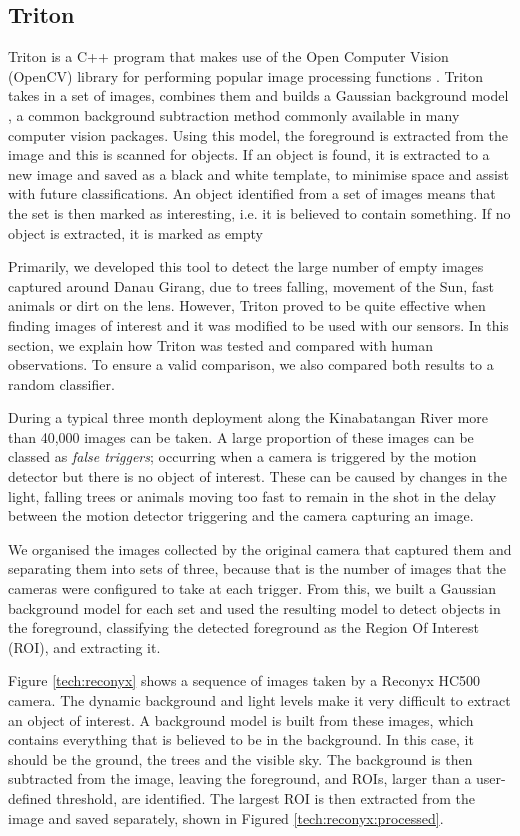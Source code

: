 	\subsection{Triton} \label{tech:sf:triton}
		Triton is a C++ program that makes use of the Open Computer Vision (OpenCV) library for performing popular image processing functions \cite{triton}. Triton takes in a set of images, combines them and builds a Gaussian background model \cite{Zivkovic2004}, a common background subtraction method commonly available in many computer vision packages. Using this model, the foreground is extracted from the image and this is scanned for objects. If an object is found, it is extracted to a new image and saved as a black and white template, to minimise space and assist with future classifications. An object identified from a set of images means that the set is then marked as interesting, i.e. it is believed to contain something. If no object is extracted, it is marked as empty
		
		Primarily, we developed this tool to detect the large number of empty images captured around Danau Girang, due to trees falling, movement of the Sun, fast animals or dirt on the lens. However, Triton proved to be quite effective when finding images of interest and it was modified to be used with our sensors. In this section, we explain how Triton was tested and compared with human observations. To ensure a valid comparison, we also compared both results to a random classifier.
	
		During a typical three month deployment along the Kinabatangan River more than 40,000 images can be taken. A large proportion of these images can be classed as \textit{false triggers}; occurring when a camera is triggered by the motion detector but there is no object of interest. These can be caused by changes in the light, falling trees or animals moving too fast to remain in the shot in the delay between the motion detector triggering and the camera capturing an image.
		
		We organised the images collected by the original camera that captured them and separating them into sets of three, because that is the number of images that the cameras were configured to take at each trigger. From this, we built a Gaussian background model \cite{Zivkovic2004} for each set and used the resulting model to detect objects in the foreground, classifying the detected foreground as the Region Of Interest (ROI), and extracting it.
	
		Figure \ref{tech:reconyx} shows a sequence of images taken by a Reconyx HC500 camera. The dynamic background and light levels make it very difficult to extract an object of interest. A background model is built from these images, which contains everything that is believed to be in the background. In this case, it should be the ground, the trees and the visible sky. The background is then subtracted from the image, leaving the foreground, and ROIs, larger than a user-defined threshold, are identified. The largest ROI is then extracted from the image and saved separately, shown in Figured \ref{tech:reconyx:processed}.

